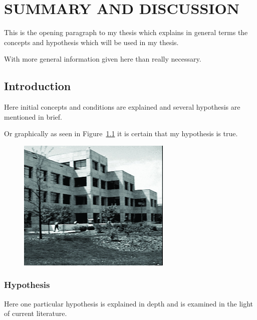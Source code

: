 \chapter{SUMMARY AND DISCUSSION}

This is the opening paragraph to my thesis which
explains in general terms the concepts and hypothesis
which will be used in my thesis.

With more general information given here than really
necessary.

\section{Introduction}

Here initial concepts and conditions are explained and
several hypothesis are mentioned in brief.

Or graphically as seen in Figure~\ref{mgraph2}
it is certain that my hypothesis is true.


\begin{figure}[H] \centering %
    \includegraphics[alt={This is alt text}]{Images/dc5}

    \label{mgraph2}
\end{figure}

\subsection{Hypothesis}

Here one particular hypothesis is explained in depth
and is examined in the light of current literature.

